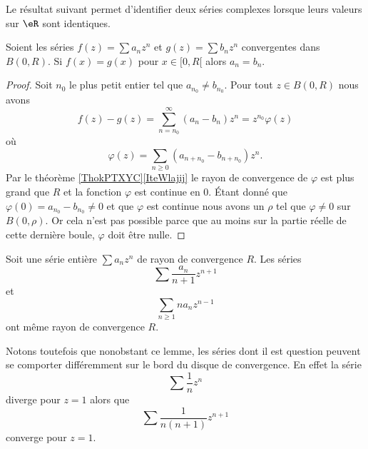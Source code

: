 
Le résultat suivant permet d'identifier deux séries complexes lorsque leurs valeurs sur \( \eR\) sont identiques.
\begin{proposition}
    Soient les séries \( f(z)=\sum a_nz^n\) et \( g(z)=\sum b_n z^n\) convergentes dans \( B(0,R)\). Si \( f(x)=g(x)\) pour \( x\in \mathopen[ 0 , R [\) alors \( a_n=b_n\).
\end{proposition}

\begin{proof}
    Soit \( n_0\) le plus petit entier tel que \( a_{n_0}\neq b_{n_0}\). Pour tout \( z\in B(0,R)\) nous avons
    \begin{equation}
        f(z)-g(z)=\sum_{n=n_0}^{\infty}(a_n-b_n)z^n=z^{n_0}\varphi(z)
    \end{equation}
    où
    \begin{equation}
        \varphi(z)=\sum_{n\geq 0}(a_{n+n_0}-b_{n+n_0})z^n.
    \end{equation}
    Par le théorème \ref{ThokPTXYC}\ref{IteWlajij} le rayon de convergence de \( \varphi\) est plus grand que \( R\) et la fonction \( \varphi\) est continue en \( 0\). Étant donné que \( \varphi(0)=a_{n_0}-b_{n_0}\neq 0\) et que \( \varphi\) est continue nous avons un \( \rho\) tel que \( \varphi\neq 0\) sur \( B(0,\rho)\). Or cela n'est pas possible parce que au moins sur la partie réelle de cette dernière boule, \( \varphi\) doit être nulle.
\end{proof}

\begin{lemma}       \label{LemFVMaSD}
    Soit une série entière \( \sum a_nz^n\) de rayon de convergence \( R\). Les séries
    \begin{equation}
        \sum \frac{ a_n }{ n+1 }z^{n+1}
    \end{equation}
    et
    \begin{equation}
        \sum_{n\geq 1}na_nz^{n-1}
    \end{equation}
    ont même rayon de convergence \( R\).
\end{lemma}

Notons toutefois que nonobstant ce lemme, les séries dont il est question peuvent se comporter différemment sur le bord du disque de convergence. En effet la série
\begin{equation}
    \sum \frac{1}{ n }z^n
\end{equation}
diverge pour \( z=1\) alors que 
\begin{equation}
    \sum\frac{1}{ n(n+1) }z^{n+1}
\end{equation}
converge pour \( z=1\).

